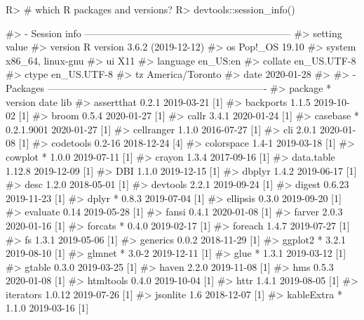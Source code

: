 \documentclass[
]{jss}
\begin{document}
\begin{CodeChunk}

\begin{CodeInput}
R> # which R packages and versions?
R> devtools::session_info()
\end{CodeInput}

\begin{CodeOutput}
#> - Session info ---------------------------------------------------------------
#>  setting  value                       
#>  version  R version 3.6.2 (2019-12-12)
#>  os       Pop!_OS 19.10               
#>  system   x86_64, linux-gnu           
#>  ui       X11                         
#>  language en_US:en                    
#>  collate  en_US.UTF-8                 
#>  ctype    en_US.UTF-8                 
#>  tz       America/Toronto             
#>  date     2020-01-28                  
#> 
#> - Packages -------------------------------------------------------------------
#>  package     * version    date       lib
#>  assertthat    0.2.1      2019-03-21 [1]
#>  backports     1.1.5      2019-10-02 [1]
#>  broom         0.5.4      2020-01-27 [1]
#>  callr         3.4.1      2020-01-24 [1]
#>  casebase    * 0.2.1.9001 2020-01-27 [1]
#>  cellranger    1.1.0      2016-07-27 [1]
#>  cli           2.0.1      2020-01-08 [1]
#>  codetools     0.2-16     2018-12-24 [4]
#>  colorspace    1.4-1      2019-03-18 [1]
#>  cowplot     * 1.0.0      2019-07-11 [1]
#>  crayon        1.3.4      2017-09-16 [1]
#>  data.table    1.12.8     2019-12-09 [1]
#>  DBI           1.1.0      2019-12-15 [1]
#>  dbplyr        1.4.2      2019-06-17 [1]
#>  desc          1.2.0      2018-05-01 [1]
#>  devtools      2.2.1      2019-09-24 [1]
#>  digest        0.6.23     2019-11-23 [1]
#>  dplyr       * 0.8.3      2019-07-04 [1]
#>  ellipsis      0.3.0      2019-09-20 [1]
#>  evaluate      0.14       2019-05-28 [1]
#>  fansi         0.4.1      2020-01-08 [1]
#>  farver        2.0.3      2020-01-16 [1]
#>  forcats     * 0.4.0      2019-02-17 [1]
#>  foreach       1.4.7      2019-07-27 [1]
#>  fs            1.3.1      2019-05-06 [1]
#>  generics      0.0.2      2018-11-29 [1]
#>  ggplot2     * 3.2.1      2019-08-10 [1]
#>  glmnet      * 3.0-2      2019-12-11 [1]
#>  glue        * 1.3.1      2019-03-12 [1]
#>  gtable        0.3.0      2019-03-25 [1]
#>  haven         2.2.0      2019-11-08 [1]
#>  hms           0.5.3      2020-01-08 [1]
#>  htmltools     0.4.0      2019-10-04 [1]
#>  httr          1.4.1      2019-08-05 [1]
#>  iterators     1.0.12     2019-07-26 [1]
#>  jsonlite      1.6        2018-12-07 [1]
#>  kableExtra  * 1.1.0      2019-03-16 [1]

\end{CodeOutput}
\end{CodeChunk}
\end{document}

